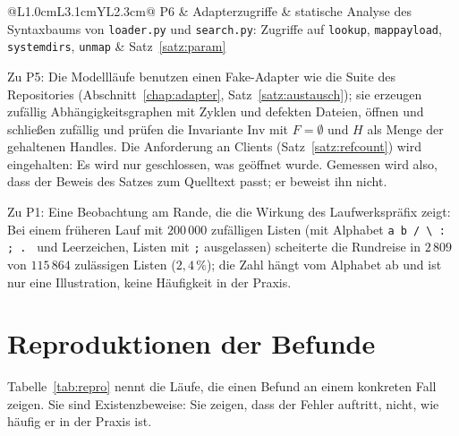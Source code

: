 \documentclass[a4paper,12pt,twoside]{report}
\DeclareRobustCommand{\_}{\ifmmode\mbox{\textunderscore}\else\textunderscore\allowbreak{}\fi}
\theoremstyle{definition}
\begin{document}
\begin{table}[!ht]
\begin{tabularx}{\textwidth}{@{}L{1.0cm}L{3.1cm}YL{2.3cm}@{}}
		P6 & Adapterzugriffe & statische Analyse des Syntaxbaums von \texttt{loader.py} und \texttt{search.py}: Zugriffe auf \texttt{lookup}, \texttt{map\_payload}, \texttt{system\_dirs}, \texttt{unmap} & Satz~\ref{satz:param} \\
		\bottomrule
	\end{tabularx}
	\caption{Zufalls- und Modellprüfungen. Alle Läufe mit festem Startwert.}
	\label{tab:laeufe}
\end{table}

Zu P5: Die Modellläufe benutzen einen Fake-Adapter wie die Suite des Repositories (Abschnitt~\ref{chap:adapter}, Satz~\ref{satz:austausch}); sie erzeugen zufällig Abhängigkeitsgraphen mit Zyklen und defekten Dateien, öffnen und schließen zufällig und prüfen die Invariante $\mathrm{Inv}$ mit $F=\emptyset$ und $H$ als Menge der gehaltenen Handles. Die Anforderung an Clients (Satz~\ref{satz:refcount}) wird eingehalten: Es wird nur geschlossen, was geöffnet wurde. Gemessen wird also, dass der Beweis des Satzes zum Quelltext passt; er beweist ihn nicht.

Zu P1: Eine Beobachtung am Rande, die die Wirkung des Laufwerkspräfix zeigt: Bei einem früheren Lauf mit $200\,000$ zufälligen Listen (mit Alphabet \texttt{a b / \textbackslash\ : ; . } und Leerzeichen, Listen mit \texttt{;} ausgelassen) scheiterte die Rundreise in $2\,809$ von $115\,864$ zulässigen Listen ($2{,}4\,\%$); die Zahl hängt vom Alphabet ab und ist nur eine Illustration, keine Häufigkeit in der Praxis.

\section{Reproduktionen der Befunde}

Tabelle~\ref{tab:repro} nennt die Läufe, die einen Befund an einem konkreten Fall zeigen. Sie sind Existenzbeweise: Sie zeigen, dass der Fehler auftritt, nicht, wie häufig er in der Praxis ist.
\end{document}
